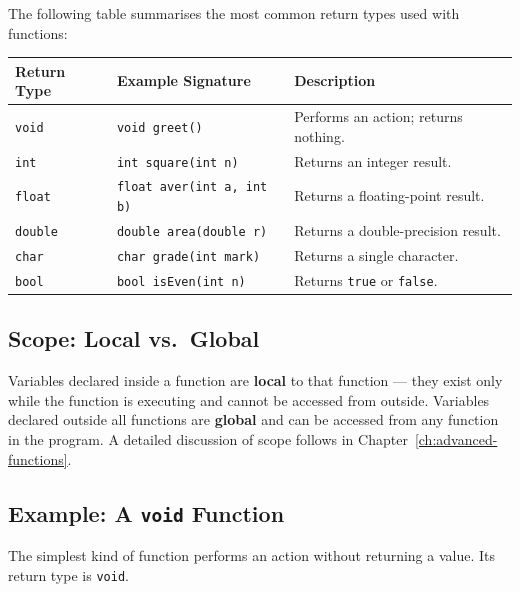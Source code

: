 The following table summarises the most common return types used with
functions:

\begin{center}
\renewcommand{\arraystretch}{1.4}
\begin{tabular}{@{}llp{6cm}@{}}
\toprule
\textbf{Return Type} & \textbf{Example Signature}
    & \textbf{Description} \\
\midrule
\texttt{void}   & \texttt{void greet()}
    & Performs an action; returns nothing. \\
\texttt{int}    & \texttt{int square(int n)}
    & Returns an integer result. \\
\texttt{float}  & \texttt{float aver(int a, int b)}
    & Returns a floating-point result. \\
\texttt{double} & \texttt{double area(double r)}
    & Returns a double-precision result. \\
\texttt{char}   & \texttt{char grade(int mark)}
    & Returns a single character. \\
\texttt{bool}   & \texttt{bool isEven(int n)}
    & Returns \texttt{true} or \texttt{false}. \\
\bottomrule
\end{tabular}
\end{center}

\subsection{Scope: Local vs.\ Global}

Variables declared inside a function are \textbf{local} to that function ---
they exist only while the function is executing and cannot be accessed from
outside. Variables declared outside all functions are \textbf{global} and can
be accessed from any function in the program. A detailed discussion of scope
follows in Chapter~\ref{ch:advanced-functions}.

\subsection{Example: A \texttt{void} Function}

The simplest kind of function performs an action without returning a value.
Its return type is \texttt{void}.

